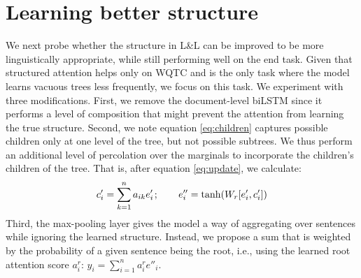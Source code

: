 \section{Learning better structure} We next probe whether the structure in L\&L can be improved to be more linguistically appropriate, while still performing well on the end task. Given that structured attention helps only on WQTC and is the only task where the model learns vacuous trees less frequently, we focus on this task. We experiment with three modifications. First, we remove the document-level biLSTM since it performs a level of composition that might prevent the attention from learning the true structure. Second, we note equation \ref{eq:children} captures possible children only at one level of the tree, but not possible subtrees. We thus perform an additional level of percolation over the marginals to incorporate the children's children of the tree. That is, after equation \ref{eq:update}, we calculate:
\vspace{-0.5em}
\begin{equation}
c'_i = \sum^{n}_{k=1}a_{ik}e'_{i}\hspace{1pt};\hspace{20pt}e''_i = \tanh(W_r[e'_i, c'_i])
\vspace{-0.3em}
\end{equation}
Third, the max-pooling layer gives the model a way of aggregating over sentences while ignoring the learned structure. Instead, we propose a sum that is weighted by the probability of a given sentence being the root, i.e., using the learned root attention score $a_i^r$: $y_i=\sum_{i=1}^n a_i^r e''_i$.

\begin{table}[t]
\centering
\small
{}
\vspace{-0.7em}
\caption{Mean test accuracy and tree statistics on the WQTC dev set (averaged across four runs).  -biLSTM removes the document-level biLSTM, +w uses the weighted sum, +p performs 1 extra percolation, and +4p does 4 levels of percolation. The last row are (`gold') parsed RST discourse dependency trees.}
\label{tab:results_deeper}
\end{table}

